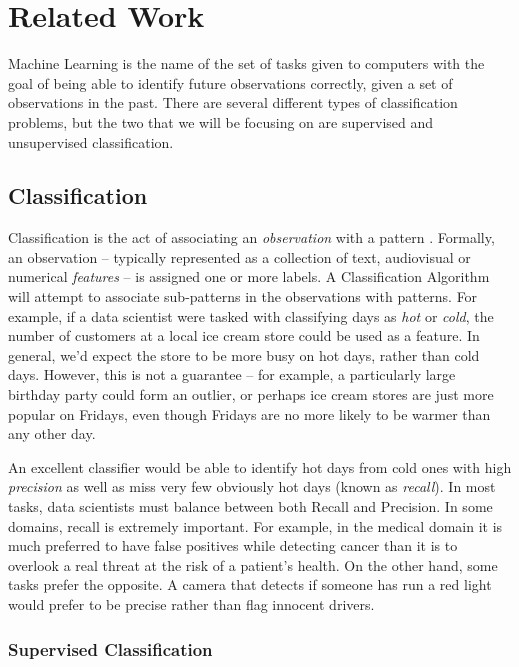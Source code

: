 \chapter{Related Work}\label{sec:related}

Machine Learning is the name of the set of tasks given to computers with the goal of being able to identify future observations correctly, given a set of observations in the past. There are several different types of classification problems, but the two that we will be focusing on are supervised and unsupervised classification. 

\section{Classification}

Classification is the act of associating an \textit{observation} with a pattern \cite{liu2007web}. Formally, an observation -- typically represented as a collection of text, audiovisual or numerical \textit{features} -- is assigned one or more labels. A Classification Algorithm will attempt to associate sub-patterns in the observations with patterns. For example, if a data scientist were tasked with classifying days as \textit{hot} or \textit{cold}, the number of customers at a local ice cream store could be used as a feature. In general, we'd expect the store to be more busy on hot days, rather than cold days. However, this is not a guarantee -- for example, a particularly large birthday party could form an outlier, or perhaps ice cream stores are just more popular on Fridays, even though Fridays are no more likely to be warmer than any other day. 

An excellent classifier would be able to identify hot days from cold ones with high \textit{precision} as well as miss very few obviously hot days (known as \textit{recall}). In most tasks, data scientists must balance between both Recall and Precision. In some domains, recall is extremely important. For example, in the medical domain it is much preferred to have false positives while detecting cancer than it is to overlook a real threat at the risk of a patient's health.  On the other hand, some tasks prefer the opposite. A camera that detects if someone has run a red light would prefer to be precise rather than flag innocent drivers.

\subsection{Supervised Classification}

